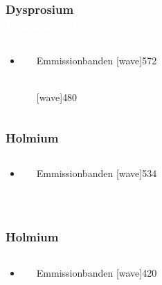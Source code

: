 \documentclass{beamer}
\begin{document}
 \begin{frame}[t]\frametitle{ Dysprosium  \\ \textcolor{white}{Dysprosiumi} }
 \begin{columns}
    \begin{block}{}
      \begin{itemize}
        \item
      \end{itemize}
    \end{block}
\begin{block}{Emmissionbanden}
[wave]{572}{\parbox{4cm}{}}\\
[wave]{480}{\parbox{4cm}{}}

\end{block}
\end{columns}
  \end{frame}
\begin{frame}[t]\frametitle{ Holmium  }
 \begin{columns}
    \begin{block}{}
      \begin{itemize}
        \item
      \end{itemize}
    \end{block}
\begin{block}{Emmissionbanden}
[wave]{534}{\parbox{4cm}{}}\\
\end{block}
\end{columns}
  \end{frame}


\begin{frame}[t]\frametitle{ Holmium  }
 \begin{columns}
    \begin{block}{}
      \begin{itemize}
        \item
      \end{itemize}
    \end{block}
\begin{block}{Emmissionbanden}
[wave]{420}{\parbox{4cm}{}}\\
\end{block}
\end{columns}
  \end{frame}
\end{document}
